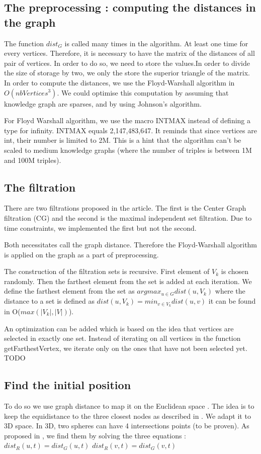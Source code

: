 \documentclass{article}
\begin{document}
\subsection{The preprocessing : computing the distances in the graph}
The function $dist_{G}$ is called many times in the algorithm. At least one time for every vertices. Therefore, it is necessary to have the matrix of the distances of all pair of vertices. In order to do so, we need to store the values.In order to divide the size of storage by two, we only the store the superior triangle of the matrix. 
In order to compute the distances, we use the Floyd-Warshall algorithm in $O(nbVertices^3)$. We could optimise this computation by assuming that knowledge graph are sparses, and by using Johnson's algorithm.  

For Floyd Warshall algorithm, we use the macro INT\underscore MAX instead of defining a type for infinity. INT\underscore MAX equals 2,147,483,647. It reminds that since vertices are int, their number is limited to 2M. This is a hint that the algorithm can't be scaled to medium knowledge graphs (where the number of triples is between 1M and 100M triples). 


\subsection{The filtration}
There are two filtrations proposed in the article. 
The first is the Center Graph filtration (CG) and the second is the maximal independent set filtration.
Due to time constraints, we implemented the first but not the second. 

Both necessitates call the graph distance. Therefore the Floyd-Warshall algorithm is applied on the graph as a part of preprocessing. 

The construction of the filtration sets is recursive.
First element of $V_{k}$ is chosen randomly. 
Then the farthest element from the set is added at each iteration. 
We define the farthest element from the set as 
$argmax_{u \in G} dist(u, V_{k})$
where the distance to a set is defined as $dist(u, V_{k}) = min_{v \in V_{k}} dist(u, v)$
it can be found in O($ max(|V_{k}|, |V|)$). 

An optimization can be added which is based on the idea that vertices are selected in exactly one set. Instead of iterating on all vertices in the function getFarthestVertex, we iterate only on the ones that have not been selected yet. TODO

\subsection{Find the initial position}
To do so we use graph distance to map it on the Euclidean space . The idea is to keep the equidistance to the three closest nodes as described in \cite{gajer00}. 
We adapt it to 3D space. 
In 3D, two spheres can have 4 intersections points (to be proven).
As proposed in \cite{gajer00},  we find them by solving the three equations : 
$dist_{R}(u, t) = dist_{G}(u, t)$
$dist_{R}(v, t) = dist_{G}(v, t)$
\end{document}
